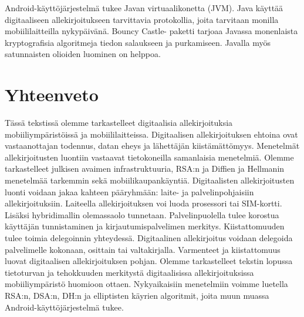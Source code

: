 \documentclass[finnish]{tktltiki2}
\theoremstyle{definition}
\theoremstyle{remark}
\begin{document}
Android-käyttöjärjestelmä tukee Javan virtuaalikonetta (JVM). Java käyttää digitaaliseen allekirjoitukseen tarvittavia protokollia, joita tarvitaan monilla mobiililaitteilla nykypäivänä. Bouncy Castle- paketti tarjoaa Javassa monenlaista kryptografisia algoritmeja tiedon salaukseen ja purkamiseen. Javalla myös satunnaisten olioiden luominen on helppoa. \cite{enti}   

\section{Yhteenveto}  

Tässä tekstissä olemme tarkastelleet digitaalisia allekirjoituksia mobiiliympäristöissä ja mobiililaitteissa. Digitaalisen allekirjoituksen ehtoina ovat vastaanottajan todennus, datan eheys ja lähettäjän kiistämättömyys. Menetelmät allekirjoitusten luontiin vastaavat tietokoneilla samanlaisia menetelmiä. Olemme tarkastelleet julkisen avaimen infrastruktuuria, RSA:n ja Diffien ja Hellmanin menetelmää tarkemmin sekä mobiilikaupankäyntiä. Digitaalisten allekirjoitusten luonti voidaan jakaa kahteen pääryhmään: laite- ja palvelinpohjaisiin allekirjoituksiin. Laiteella allekirjoituksen voi luoda prosessori tai SIM-kortti. Lisäksi hybridimallin olemassaolo tunnetaan. Palvelinpuolella tulee korostua käyttäjän tunnistaminen ja kirjautumispalvelimen merkitys. Kiistattomuuden tulee toimia delegoinnin yhteydessä. Digitaalinen allekirjoitus voidaan delegoida palvelimelle kokonaan, osittain tai valtakirjalla. Varmenteet ja kiistattomuus luovat digitaalisen allekirjoituksen pohjan. Olemme tarkastelleet tekstin lopussa tietoturvan ja tehokkuuden merkitystä digitaalisissa allekirjoituksissa mobiiliympäristö huomioon ottaen. Nykyaikaisiin menetelmiin voimme luetella RSA:n, DSA:n, DH:n ja elliptisten käyrien algoritmit, joita muun muassa Android-käyttöjärjestelmä tukee.


%
%
%

\newpage






 
\end{document}
